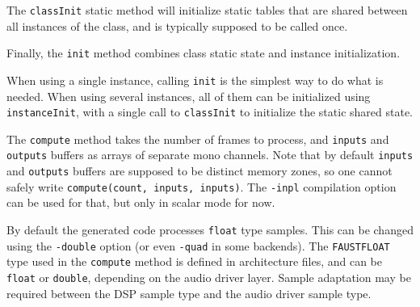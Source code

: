 The \lstinline'classInit' static method will initialize static tables that are shared between all instances of the class, and is typically supposed to be called once. 

Finally, the \lstinline'init' method combines class static state and instance initialization.

When using a single instance, calling  \lstinline'init'  is the simplest way to do what is needed. When using several instances, all of them can be initialized using  \lstinline'instanceInit', with a single call to \lstinline'classInit' to initialize the static shared state.  

The \lstinline'compute' method takes the number of frames to process, and \lstinline'inputs' and \lstinline'outputs' buffers as arrays of separate mono channels. Note that by default \lstinline'inputs' and \lstinline'outputs' buffers are supposed to be distinct memory zones, so one cannot safely write \lstinline'compute(count, inputs, inputs)'. The \lstinline'-inpl' compilation option can be used for that, but only in scalar mode for now. 

By default the generated code processes \lstinline'float' type samples. This can be changed using the \lstinline'-double' option (or even \lstinline'-quad' in some backends). The \lstinline'FAUSTFLOAT' type used in the \lstinline'compute' method is defined in architecture files, and can be \lstinline'float' or \lstinline'double', depending on the audio driver layer. Sample adaptation may be required between the DSP sample type and the audio driver sample type.

